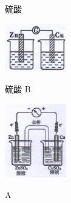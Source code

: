 \documentclass[10pt]{article}
\begin{document}
硫酸

\begin{center}
\includegraphics[max width=0.2\textwidth]{images/0190d978-baee-71c0-9ae7-986c76919c41_0_740902.jpg}
\end{center}

硫酸 B

\begin{center}
\includegraphics[max width=0.2\textwidth]{images/0190d978-baee-71c0-9ae7-986c76919c41_0_865857.jpg}
\end{center}

A
\end{document}
